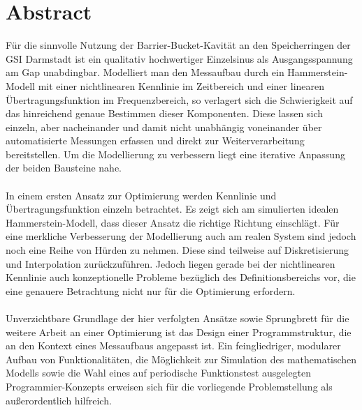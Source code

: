 \documentclass[../Report.tex]{subfiles}
\begin{document}
\chapter{Abstract}
\label{chap:abstract}

Für die sinnvolle Nutzung der Barrier-Bucket-Kavität an den Speicherringen der GSI Darmstadt ist ein qualitativ hochwertiger Einzelsinus als Ausgangsspannung am Gap unabdingbar. 
Modelliert man den Messaufbau durch ein Hammerstein-Modell mit einer nichtlinearen Kennlinie im Zeitbereich und einer linearen Übertragungsfunktion im Frequenzbereich, so verlagert sich die Schwierigkeit auf das hinreichend genaue Bestimmen dieser Komponenten.
Diese lassen sich einzeln, aber nacheinander und damit nicht unabhängig voneinander über automatisierte Messungen erfassen und direkt zur Weiterverarbeitung bereitstellen. Um die Modellierung zu verbessern liegt eine iterative Anpassung der beiden Bausteine nahe.
\\
\\
In einem ersten Ansatz zur Optimierung werden Kennlinie und Übertragungsfunktion einzeln betrachtet. Es zeigt sich am simulierten idealen Hammerstein-Modell, dass dieser Ansatz die richtige Richtung einschlägt.
Für eine merkliche Verbesserung der Modellierung auch am realen System sind jedoch noch eine Reihe von Hürden zu nehmen. Diese sind teilweise auf Diskretisierung und Interpolation zurückzuführen. Jedoch liegen gerade bei der nichtlinearen Kennlinie auch konzeptionelle Probleme bezüglich des Definitionsbereichs vor, die eine genauere Betrachtung nicht nur für die Optimierung erfordern.
\\
\\
Unverzichtbare Grundlage der hier verfolgten Ansätze sowie Sprungbrett für die weitere Arbeit an einer Optimierung ist das Design einer Programmstruktur, die an den Kontext eines Messaufbaus angepasst ist. Ein feingliedriger, modularer Aufbau von Funktionalitäten, die Möglichkeit zur Simulation des mathematischen Modells sowie die Wahl eines auf periodische Funktionstest ausgelegten Programmier-Konzepts erweisen sich für die vorliegende Problemstellung als außerordentlich hilfreich.
\end{document}

